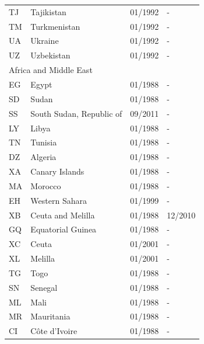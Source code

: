 \begin{footnotesize}
\begin{longtable}{p{0.5cm}p{9cm}p{2cm}p{2cm}}
TJ	&	Tajikistan	&	01/1992	&	-	\\

TM	&	Turkmenistan	&	01/1992	&	-	\\

UA	&	Ukraine	&	01/1992	&	-	\\

UZ	&	Uzbekistan	&	01/1992	&	-	\\

\midrule
\multicolumn{3}{l}{Africa and Middle East}	&	\\
EG	&	Egypt	&	01/1988	&	-	\\

SD	&	Sudan	&	01/1988	&	-	\\

SS	&	South Sudan, Republic of	&	09/2011	&	-	\\

LY	&	Libya	&	01/1988	&	-	\\

TN	&	Tunisia	&	01/1988	&	-	\\

DZ	&	Algeria	&	01/1988	&	-	\\

XA	&	Canary Islands	&	01/1988	&	-	\\

MA	&	Morocco	&	01/1988	&	-	\\

EH	&	Western Sahara	&	01/1999	&	-	\\

XB	&	Ceuta and Melilla	&	01/1988	&	12/2010	\\

GQ	&	Equatorial Guinea	&	01/1988	&	-	\\

XC	&	Ceuta	&	01/2001	&	-	\\

XL	&	Melilla	&	01/2001	&	-	\\

TG	&	Togo	&	01/1988	&	-	\\

SN	&	Senegal	&	01/1988	&	-	\\

ML	&	Mali	&	01/1988	&	-	\\

MR	&	Mauritania	&	01/1988	&	-	\\

CI	&	Côte d'Ivoire	&	01/1988	&	-	\\


\end{longtable}
\end{footnotesize}
